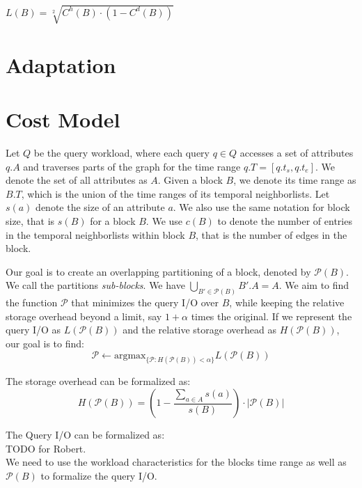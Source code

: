 \documentclass{sig-alternate}
\begin{document}
$L(B) = \sqrt[2]{C^h(B) \cdot ( 1 - C^d(B))}$



\section{Adaptation}

\section{Cost Model}

Let $Q$ be the query workload, where each query $q\in Q$ accesses a set of
attributes $q.A$ and traverses parts of the graph for the time range
$q.T=[q.t_s,q.t_e]$. We denote the set of all attributes as $A$. Given a block
$B$, we denote its time range as $B.T$, which is the union of the time ranges
of its temporal neighborlists. Let $s(a)$ denote the size of an attribute $a$.
We also use the same notation for block size, that is $s(B)$ for a block $B$. 
We use $c(B)$ to denote the number of entries in the temporal neighborlists
within block $B$, that is the number of edges in the block. 

Our goal is to create an overlapping partitioning of a block, denoted by
$\mathcal{P}(B)$. We call the partitions \emph{sub-blocks}. We have
$\bigcup_{B'\in \mathcal{P}(B)} B'.A = A$. We aim to find the function
$\mathcal{P}$ that minimizes the query I/O over $B$, while keeping the
relative storage overhead beyond a limit, say $1+\alpha$ times the original.
If we represent the query I/O as $L(\mathcal{P}(B))$ and the relative storage
overhead as $H(\mathcal{P}(B))$, our goal is to find:
\begin{equation}
\mathcal{P} \leftarrow \mbox{argmax}_{\{\mathcal{P}: H(\mathcal{P}(B)) < \alpha\}} L(\mathcal{P}(B))
\end{equation}

The storage overhead can be formalized as:
\begin{equation}
H(\mathcal{P}(B)) = (1-\frac{\sum_{a\in A} s(a)}{s(B)})\cdot |\mathcal{P}(B)| 
\end{equation}

The Query I/O can be formalized as:\\
TODO for Robert.\\
We need to use the workload characteristics for the blocks time range as
well as $\mathcal{P}(B)$ to formalize the query I/O.\\



 
\end{document}
